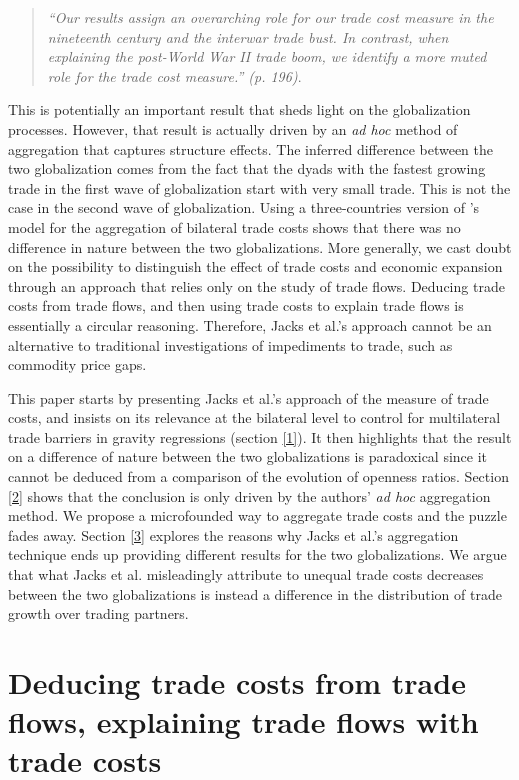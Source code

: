 \documentclass{article}
\begin{document}
\begin{quote}
\emph{``Our results assign an overarching role for our trade
cost measure in the nineteenth century and the interwar trade
bust. In contrast, when explaining the post-World War II trade
boom, we identify a more muted role for the trade cost
measure.'' (p. 196)}.
\end{quote}

This is potentially an important result that sheds light on the globalization processes. However, that result is actually driven by an \textit{ad hoc}
method of aggregation that captures structure effects. The inferred difference between the two globalization comes from the fact that the dyads with the 
fastest growing trade in the first wave of globalization start with very small 
trade. This is not the case in the second wave of globalization.
Using a three-countries version of \cite{AW2003}'s model for
the aggregation of bilateral trade costs shows that there was no 
difference in nature between the two globalizations. More generally, we
cast doubt on the possibility to distinguish the effect of trade costs and economic expansion through an approach that relies only on the study of trade
flows. Deducing trade costs from trade flows, and then using
trade costs to explain trade flows is essentially a circular
reasoning. Therefore, Jacks et al.'s approach cannot be an
alternative to traditional investigations of impediments to
trade, such as commodity price gaps.

This paper starts by presenting Jacks et al.'s approach of the
measure of trade costs, and insists on its relevance at the
bilateral level to control for multilateral trade barriers in
gravity regressions (section \ref{1}). It then highlights that the
result on a difference of nature between the two globalizations
is paradoxical since it cannot be deduced from a comparison of the
evolution of openness ratios. Section \ref{2} shows that the
conclusion is only driven by the authors' \textit{ad hoc} aggregation
method. We propose a microfounded way to aggregate trade costs
and the puzzle fades away. Section \ref{3} explores the reasons
why Jacks et al.'s aggregation technique ends up providing
different results for the two globalizations. We argue that
what Jacks et al. misleadingly attribute to unequal trade costs
decreases between the two globalizations is instead a
difference in the distribution of trade growth over trading
partners.

\section{\label{1} Deducing trade costs from trade flows, explaining trade flows with trade costs}
\end{document}
